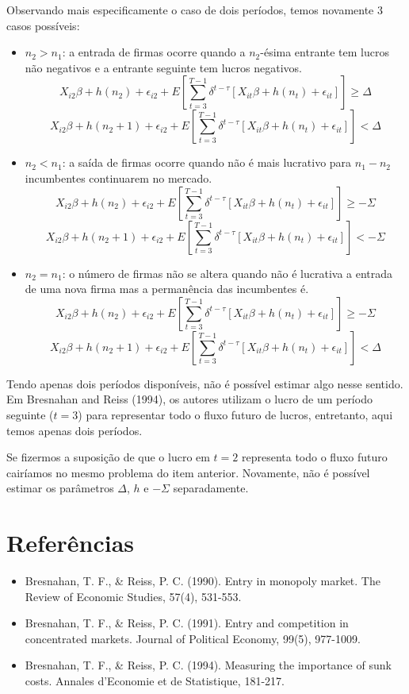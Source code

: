 \documentclass[
  12pt,
]{article}
\providecommand{\tightlist}{%
  \setlength{\itemsep}{0pt}\setlength{\parskip}{0pt}}
\begin{document}
Observando mais especificamente o caso de dois períodos, temos novamente
3 casos possíveis:

\begin{itemize}
\item
  \(n_2 > n_1\): a entrada de firmas ocorre quando a \(n_2\)-ésima
  entrante tem lucros não negativos e a entrante seguinte tem lucros
  negativos. \[
  X_{i2}\beta + h(n_2) + \epsilon_{i2} + E\left[\sum_{t=3}^{T-1} \delta^{t-\tau}[X_{it}\beta + h(n_t) + \epsilon_{it}] \right] \geq \Delta
  \] \[
  X_{i2}\beta + h(n_2+1) + \epsilon_{i2} + E\left[\sum_{t=3}^{T-1} \delta^{t-\tau}[X_{it}\beta + h(n_t) + \epsilon_{it}] \right] < \Delta
  \]
\item
  \(n_2 < n_1\): a saída de firmas ocorre quando não é mais lucrativo
  para \(n_1 - n_2\) incumbentes continuarem no mercado. \[
  X_{i2}\beta + h(n_2) + \epsilon_{i2} + E\left[\sum_{t=3}^{T-1} \delta^{t-\tau}[X_{it}\beta + h(n_t) + \epsilon_{it}] \right] \geq -\Sigma
  \] \[
  X_{i2}\beta + h(n_2+1) + \epsilon_{i2} + E\left[\sum_{t=3}^{T-1} \delta^{t-\tau}[X_{it}\beta + h(n_t) + \epsilon_{it}] \right] < -\Sigma
  \]
\item
  \(n_2 = n_1\): o número de firmas não se altera quando não é lucrativa
  a entrada de uma nova firma mas a permanência das incumbentes é. \[
  X_{i2}\beta + h(n_2) + \epsilon_{i2} + E\left[\sum_{t=3}^{T-1} \delta^{t-\tau}[X_{it}\beta + h(n_t) + \epsilon_{it}] \right] \geq -\Sigma
  \] \[
  X_{i2}\beta + h(n_2+1) + \epsilon_{i2} + E\left[\sum_{t=3}^{T-1} \delta^{t-\tau}[X_{it}\beta + h(n_t) + \epsilon_{it}] \right] < \Delta
  \]
\end{itemize}

Tendo apenas dois períodos disponíveis, não é possível estimar algo
nesse sentido. Em Bresnahan and Reiss (1994), os autores utilizam o
lucro de um período seguinte (\(t=3\)) para representar todo o fluxo
futuro de lucros, entretanto, aqui temos apenas dois períodos.

Se fizermos a suposição de que o lucro em \(t=2\) representa todo o
fluxo futuro cairíamos no mesmo problema do item anterior. Novamente,
não é possível estimar os parâmetros \(\Delta\), \(h\) e \(-\Sigma\)
separadamente.

\vspace{1cm}

\hypertarget{referuxeancias}{%
\section{Referências}\label{referuxeancias}}

\begin{itemize}
\tightlist
\item
  Bresnahan, T. F., \& Reiss, P. C. (1990). Entry in monopoly market.
  The Review of Economic Studies, 57(4), 531-553.
\item
  Bresnahan, T. F., \& Reiss, P. C. (1991). Entry and competition in
  concentrated markets. Journal of Political Economy, 99(5), 977-1009.
\item
  Bresnahan, T. F., \& Reiss, P. C. (1994). Measuring the importance of
  sunk costs. Annales d'Economie et de Statistique, 181-217.
\end{itemize}
\end{document}
